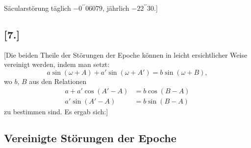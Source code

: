 \documentclass[10pt,a4paper]{article}
\begin{document}
Säcularstörung täglich $-0^{\prime\prime}06079$, jährlich $-22^{\prime\prime}30$.]

\newpage
\subsection*{[7.]}

[Die beiden Theile der Störungen der Epoche können in leicht ersichtlicher Weise vereinigt werden, 
indem man setzt:
\[
a \sin(\omega + A) + a' \sin(\omega + A') = b \sin(\omega + B),
\]
wo $b$, $B$ aus den Relationen
\begin{align*}
a + a' \cos(A' - A) &= b \cos(B - A) \\
a' \sin(A' - A) &= b \sin(B - A)
\end{align*}
zu bestimmen sind. Es ergab sich:]

\newpage
\subsection*{Vereinigte Störungen der Epoche}
\end{document}
